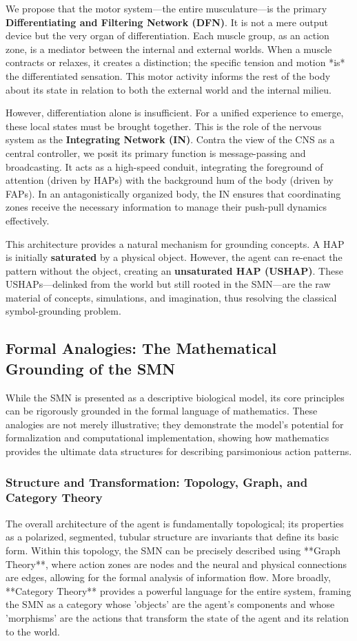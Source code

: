 We propose that the motor system—the entire musculature—is the primary \textbf{Differentiating and Filtering Network (DFN)}. It is not a mere output device but the very organ of differentiation. Each muscle group, as an action zone, is a mediator between the internal and external worlds. When a muscle contracts or relaxes, it creates a distinction; the specific tension and motion *is* the differentiated sensation. This motor activity informs the rest of the body about its state in relation to both the external world and the internal milieu.

However, differentiation alone is insufficient. For a unified experience to emerge, these local states must be brought together. This is the role of the nervous system as the \textbf{Integrating Network (IN)}. Contra the view of the CNS as a central controller, we posit its primary function is message-passing and broadcasting. It acts as a high-speed conduit, integrating the foreground of attention (driven by HAPs) with the background hum of the body (driven by FAPs). In an antagonistically organized body, the IN ensures that coordinating zones receive the necessary information to manage their push-pull dynamics effectively.

This architecture provides a natural mechanism for grounding concepts. A HAP is initially \textbf{saturated} by a physical object. However, the agent can re-enact the pattern without the object, creating an \textbf{unsaturated HAP (USHAP)}. These USHAPs—delinked from the world but still rooted in the SMN—are the raw material of concepts, simulations, and imagination, thus resolving the classical symbol-grounding problem.

\subsection{Formal Analogies: The Mathematical Grounding of the SMN}
\label{subsec:formal_analogies}
While the SMN is presented as a descriptive biological model, its core principles can be rigorously grounded in the formal language of mathematics. These analogies are not merely illustrative; they demonstrate the model's potential for formalization and computational implementation, showing how mathematics provides the ultimate data structures for describing parsimonious action patterns.

\subsubsection{Structure and Transformation: Topology, Graph, and Category Theory}
\label{ssubsec:formal_structure}
The overall architecture of the agent is fundamentally topological; its properties as a polarized, segmented, tubular structure are invariants that define its basic form. Within this topology, the SMN can be precisely described using **Graph Theory**, where action zones are nodes and the neural and physical connections are edges, allowing for the formal analysis of information flow. More broadly, **Category Theory** provides a powerful language for the entire system, framing the SMN as a category whose 'objects' are the agent's components and whose 'morphisms' are the actions that transform the state of the agent and its relation to the world.

